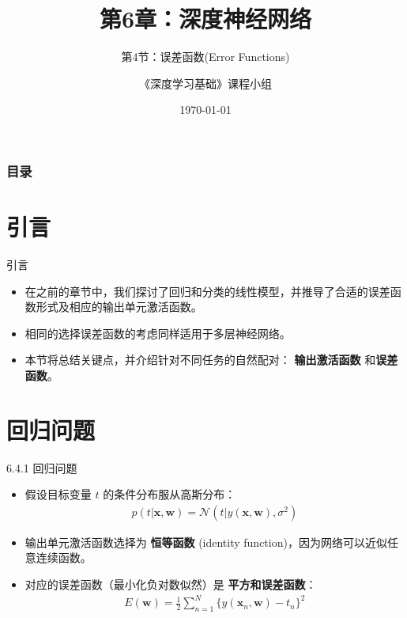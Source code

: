 \documentclass[t,aspectratio=169]{beamer} %
\title[6.4.误差函数]{第6章：深度神经网络}
\subtitle{第4节：误差函数(Error Functions)}
\author{《深度学习基础》课程小组}
\date{\today}
\begin{document}
\frame{\maketitle}

\begin{frame}
    \frametitle{目录}
    \tableofcontents
\end{frame}

\section{引言}
\begin{frame}{引言}
    \begin{itemize}
        \item 在之前的章节中，我们探讨了回归和分类的线性模型，并推导了合适的误差函数形式及相应的输出单元激活函数。
        \item 相同的选择误差函数的考虑同样适用于多层神经网络。
        \item 本节将总结关键点，并介绍针对不同任务的自然配对： \textbf{输出激活函数} 和\textbf{误差函数}。
    \end{itemize}
\end{frame}

\section{回归问题}
\begin{frame}{6.4.1 回归问题}
    \begin{itemize}
        \item 假设目标变量 $t$ 的条件分布服从高斯分布：
        \begin{align}
            p(t|\mathbf{x}, \mathbf{w}) = \mathcal{N}\left(t|y(\mathbf{x}, \mathbf{w}), \sigma^2\right) %
        \end{align}
        \item 输出单元激活函数选择为 \textbf{恒等函数} (identity function)，因为网络可以近似任意连续函数。
        \item 对应的误差函数（最小化负对数似然）是 \textbf{平方和误差函数}：
        \begin{align}
            E(\mathbf{w}) = \frac{1}{2} \sum_{n=1}^N \{y(\mathbf{x}_n, \mathbf{w}) - t_n\}^2 %
        \end{align}
    \end{itemize}
\end{frame}
\end{document}
